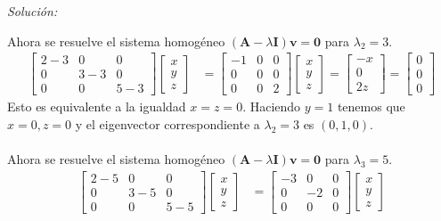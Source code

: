 \documentclass[12pt]{article}
\newenvironment{sol}
    {\emph{Solución:}
    }
    {
    }
\begin{document}
\begin{sol}
Ahora se resuelve el sistema homogéneo $(\mathbf{A}-\lambda\mathbf{I})\mathbf{v}=\mathbf{0}$ para $\lambda_2=3$.
\begin{align*}
\begin{bmatrix}
2-3 & 0 & 0\\
0 & 3-3 & 0 \\
0 & 0 & 5-3
\end{bmatrix}
\begin{bmatrix}
x\\y\\z
\end{bmatrix}
&= 
\begin{bmatrix}
-1 & 0 & 0\\
0 & 0 & 0 \\
0 & 0 & 2
\end{bmatrix}
\begin{bmatrix}
x\\y\\z
\end{bmatrix} =
\begin{bmatrix}
-x\\0\\2z
\end{bmatrix}=
\begin{bmatrix}
0\\0\\0
\end{bmatrix}
\end{align*}
Esto es equivalente a la igualdad $x=z=0$. Haciendo $y=1$ tenemos que $x=0,z=0$ y el eigenvector correspondiente a $\lambda_2=3$ es $(0,1,0)$.\\\\
Ahora se resuelve el sistema homogéneo $(\mathbf{A}-\lambda\mathbf{I})\mathbf{v}=\mathbf{0}$ para $\lambda_3=5$.
\begin{align*}
\begin{bmatrix}
2-5 & 0 & 0\\
0 & 3-5 & 0 \\
0 & 0 & 5-5
\end{bmatrix}
\begin{bmatrix}
x\\y\\z
\end{bmatrix}
&= 
\begin{bmatrix}
-3 & 0 & 0\\
0 & -2 & 0 \\
0 & 0 & 0
\end{bmatrix}
\begin{bmatrix}
x\\y\\z

\end{bmatrix}
\end{align*}
\end{sol}
\end{document}
